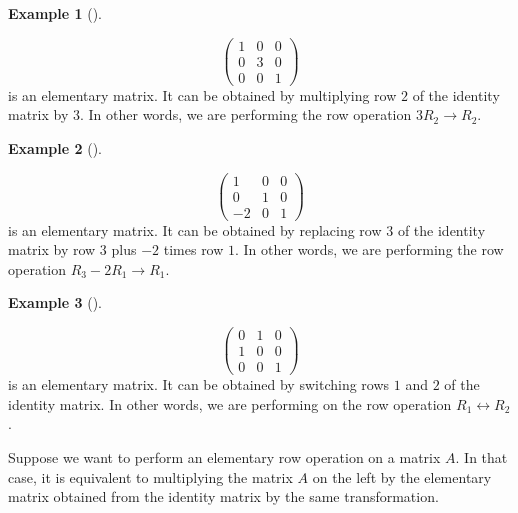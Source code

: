 \documentclass[
  a4paper,
  DIV=11,
  numbers=noendperiod,
  oneside]{scrreprt}
\theoremstyle{definition}
\newtheorem{example}{Example}[chapter]
\theoremstyle{remark}
\begin{document}
\begin{example}[]\protect\hypertarget{exm-}{}\label{exm-}

\[\left(\begin{array}{ccc}1 & 0 & 0 \\ 0 & 3 & 0 \\ 0 & 0 & 1\end{array}\right)\]
is an elementary matrix. It can be obtained by multiplying row \(2\) of
the identity matrix by \(3\). In other words, we are performing the row
operation \(3R_{2}\rightarrow R_{2}\).

\end{example}

\begin{example}[]\protect\hypertarget{exm-}{}\label{exm-}

\[\left(\begin{array}{ccc}1 & 0 & 0 \\ 0 & 1 & 0 \\ -2 & 0 & 1\end{array}\right)\]
is an elementary matrix. It can be obtained by replacing row \(3\) of
the identity matrix by row \(3\) plus \(-2\) times row \(1\). In other
words, we are performing the row operation
\(R_{3}-2 R_{1}\rightarrow R_{1}\).

\end{example}

\begin{example}[]\protect\hypertarget{exm-}{}\label{exm-}

\[\left(\begin{array}{ccc}0 & 1 & 0 \\ 1 & 0 & 0 \\ 0 & 0 & 1\end{array}\right)\]
is an elementary matrix. It can be obtained by switching rows \(1\) and
\(2\) of the identity matrix. In other words, we are performing on the
row operation \(R_{1}\leftrightarrow R_{2}\).

\end{example}

Suppose we want to perform an elementary row operation on a matrix
\(A\). In that case, it is equivalent to multiplying the matrix \(A\) on
the left by the elementary matrix obtained from the identity matrix by
the same transformation.
\end{document}
